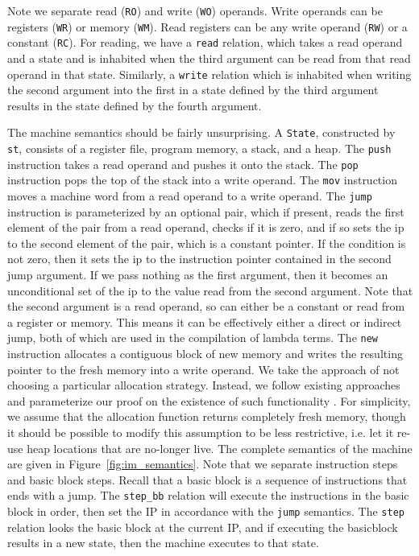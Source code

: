 Note we separate read (\texttt{RO}) and write (\texttt{WO}) operands. Write
operands can be registers (\texttt{WR}) or memory (\texttt{WM}). Read registers
can be any write operand (\texttt{RW}) or a constant (\texttt{RC}). For reading,
we have a \texttt{read} relation, which takes a read operand and a state and is
inhabited when the third argument can be read from that read operand in that
state. Similarly, a \texttt{write} relation which is inhabited when writing the
second argument into the first in a state defined by the third argument results
in the state defined by the fourth argument.  

The machine semantics should be fairly unsurprising. A \texttt{State},
constructed by \texttt{st}, consists of a register file, program memory, a
stack, and a heap. The \texttt{push} instruction takes a read operand and pushes
it onto the stack. The \texttt{pop} instruction pops the top of the stack into a
write operand. The \texttt{mov} instruction moves a machine word from a read
operand to a write operand. The \texttt{jump} instruction is parameterized by an
optional pair, which if present, reads the first element of the pair from a read
operand, checks if it is zero, and if so sets the ip to the second element of
the pair, which is a constant pointer. If the condition is not zero, then it
sets the ip to the instruction pointer contained in the second jump argument. If
we pass nothing as the first argument, then it becomes an unconditional set of
the ip to the value read from the second argument.  Note that the second
argument is a read operand, so can either be a constant or read from a register
or memory. This means it can be effectively either a direct or indirect jump,
both of which are used in the compilation of lambda terms. The \texttt{new}
instruction allocates a contiguous block of new memory and writes the resulting
pointer to the fresh memory into a write operand. We take the approach of not
choosing a particular allocation strategy. Instead, we follow existing
approaches and parameterize our proof on the existence of such functionality
\cite{chlipala2007certified}. For simplicity, we assume that the allocation
function returns completely fresh memory, though it should be possible to modify
this assumption to be less restrictive, i.e. let it re-use heap locations that
are no-longer live. The complete semantics of the machine are given in
Figure~\ref{fig:im_semantics}.  Note that we separate instruction steps and
basic block steps. Recall that a basic block is a sequence of instructions that
ends with a jump. The \texttt{step\_bb} relation will execute the instructions
in the basic block in order, then set the IP in accordance with the
\texttt{jump} semantics. The \texttt{step} relation looks the basic block at the
current IP, and if executing the basicblock results in a new state, then the
machine executes to that state. 


